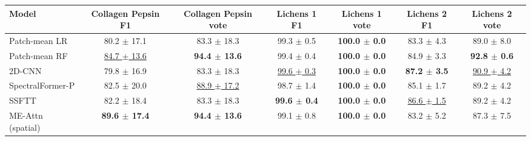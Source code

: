 \small
\begin{tabular}{lcccccc}
\toprule
Model & Collagen Pepsin F1 & Collagen Pepsin vote & Lichens 1 F1 & Lichens 1 vote & Lichens 2 F1 & Lichens 2 vote \\
\midrule
Patch-mean LR & 80.2 $\pm$ 17.1 & 83.3 $\pm$ 18.3 & 99.3 $\pm$ 0.5 & \textbf{100.0 $\pm$ 0.0} & 83.3 $\pm$ 4.3 & 89.0 $\pm$ 8.0 \\
Patch-mean RF & \underline{84.7 $\pm$ 13.6} & \textbf{94.4 $\pm$ 13.6} & 99.4 $\pm$ 0.4 & \textbf{100.0 $\pm$ 0.0} & 84.9 $\pm$ 3.3 & \textbf{92.8 $\pm$ 0.6} \\
2D-CNN & 79.8 $\pm$ 16.9 & 83.3 $\pm$ 18.3 & \underline{99.6 $\pm$ 0.3} & \textbf{100.0 $\pm$ 0.0} & \textbf{87.2 $\pm$ 3.5} & \underline{90.9 $\pm$ 4.2} \\
SpectralFormer-P & 82.5 $\pm$ 20.0 & \underline{88.9 $\pm$ 17.2} & 98.7 $\pm$ 1.4 & \textbf{100.0 $\pm$ 0.0} & 85.1 $\pm$ 1.7 & 89.2 $\pm$ 4.2 \\
SSFTT & 82.2 $\pm$ 18.4 & 83.3 $\pm$ 18.3 & \textbf{99.6 $\pm$ 0.4} & \textbf{100.0 $\pm$ 0.0} & \underline{86.6 $\pm$ 1.5} & 89.2 $\pm$ 4.2 \\
\midrule
ME-Attn (spatial) & \textbf{89.6 $\pm$ 17.4} & \textbf{94.4 $\pm$ 13.6} & 99.1 $\pm$ 0.8 & \textbf{100.0 $\pm$ 0.0} & 83.2 $\pm$ 5.2 & 87.3 $\pm$ 7.5 \\
\bottomrule
\end{tabular}
